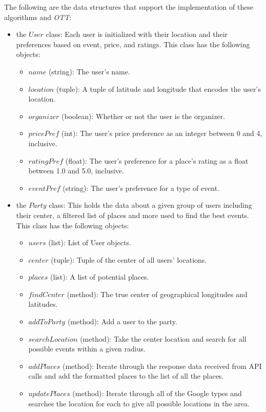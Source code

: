 \documentclass[11pt]{article}
\begin{document}
The following are the data structures that support the implementation of these algorithms and \emph{OTT}:
\begin{itemize}
    \item the $User$ class: Each user is initialized with their location and their preferences based on event, price, and ratings. This class has the following objects:
    \begin{itemize}
        \item $name$ (string): The user's name.
        \item $location$ (tuple): A tuple of latitude and longitude that encodes the user's location.
        \item $organizer$ (boolean): Whether or not the user is the organizer.
        \item $pricePref$ (int): The user's price preference as an integer between 0 and 4, inclusive.
        \item $ratingPref$ (float): The user's preference for a place's rating as a float between 1.0 and 5.0, inclusive.
        \item $eventPref$ (string): The user's preference for a type of event.
    \end{itemize}
    \item the $Party$ class: This holds the data about a given group of users including their center, a filtered list of places and more used to find the best events. This class has the following objects:
    \begin{itemize}
        \item $users$ (list): List of User objects.
        \item $center$ (tuple): Tuple of the center of all users' locations.
        \item $places$ (list): A list of potential places.
        \item $findCenter$ (method): The true center of geographical longitudes and latitudes.
        \item $addToParty$ (method): Add a user to the party.
        \item $searchLocation$ (method): Take the center location and search for all possible events within a given radius.
        \item $addPlaces$ (method): Iterate through the response data received from API calls and add the formatted places to the list of all the places.
        \item $updatePlaces$ (method): Iterate through all of the Google types and searches the location for each to give all possible locations in the area.

\end{itemize}
\end{itemize}
\end{document}
